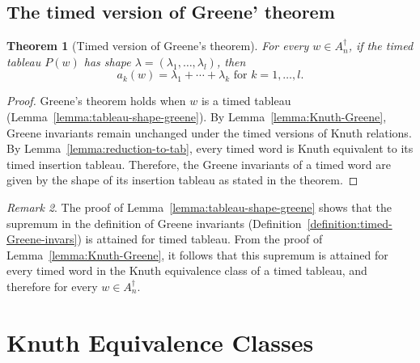 \documentclass[10pt]{amsproc}
\newtheorem{theorem}{Theorem}[subsection]
\theoremstyle{definition}
\theoremstyle{remark}
\newtheorem{remark}[theorem]{Remark}
\begin{document}
\subsection{The timed version of Greene' theorem}
\label{sec:timed-version-greene}
\begin{theorem}
  [Timed version of Greene's theorem]
  \label{theorem:timed-version-greene}
  For every $w\in A_n^\dagger$, if the timed tableau $P(w)$ has shape $\lambda=(\lambda_1,\dotsc,\lambda_l)$, then
  \begin{displaymath}
    a_k(w) = \lambda_1+\dotsb+\lambda_k \text{ for $k=1,\dotsc,l$}.
  \end{displaymath}
\end{theorem}
\begin{proof}
  Greene's theorem holds when $w$ is a timed tableau (Lemma~\ref{lemma:tableau-shape-greene}).
  By Lemma~\ref{lemma:Knuth-Greene}, Greene invariants remain unchanged under the timed versions of Knuth relations.
  By Lemma~\ref{lemma:reduction-to-tab}, every timed word is Knuth equivalent to its timed insertion tableau.
  Therefore, the Greene invariants of a timed word are given by the shape of its insertion tableau as stated in the theorem.
\end{proof}
\begin{remark}
  The proof of Lemma~\ref{lemma:tableau-shape-greene} shows that the supremum in the definition of Greene invariants (Definition~\ref{definition:timed-Greene-invars}) is attained for timed tableau.
  From the proof of Lemma~\ref{lemma:Knuth-Greene}, it follows that this supremum is attained for every timed word in the Knuth equivalence class of a timed tableau, and therefore for every $w\in A_n^\dagger$.
\end{remark}
\section{Knuth Equivalence Classes}
\label{sec:knuth-classes}
\end{document}
